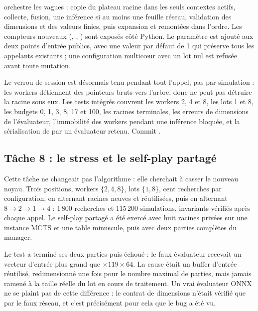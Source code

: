  orchestre les vagues : copie du plateau racine dans
les seuls contextes actifs, collecte, fusion, une inf\'erence si au moins une
feuille r\'eseau, validation des dimensions et des valeurs finies, puis
expansion et remont\'ees dans l'ordre. Les compteurs nouveaux
(, , ) sont
expos\'es c\^ot\'e Python. Le param\`etre  est ajout\'e
aux deux points d'entr\'ee publics, avec une valeur par d\'efaut de 1 qui
pr\'eserve tous les appelants existants ; une configuration
multic\oe{}ur avec un lot nul est refus\'ee avant toute mutation.

Le verrou de session est d\'esormais tenu pendant tout l'appel, pas par
simulation : les workers d\'etiennent des pointeurs bruts vers l'arbre, donc
 ne peut pas d\'etruire la racine sous eux. Les tests
int\'egr\'es couvrent les workers 2, 4 et 8, les lots 1 et 8, les budgets 0,
1, 3, 8, 17 et 100, les racines terminales, les erreurs de dimensions de
l'\'evaluateur, l'immobilit\'e des workers pendant une inf\'erence bloqu\'ee,
et la s\'erialisation de  par un \'evaluateur retenu.
Commit .

\subsection{T\^ache 8 : le stress et le self-play partag\'e}
\label{sec:t8}

Cette t\^ache ne changeait pas l'algorithme : elle cherchait \`a casser le
nouveau noyau. Trois positions, workers $\{2, 4, 8\}$, lots $\{1, 8\}$, cent
recherches par configuration, en alternant racines neuves et r\'eutilis\'ees,
puis en alternant $8 \to 2 \to 1 \to 4$ : 1\,800 recherches et 115\,200
simulations, invariants v\'erifi\'es apr\`es chaque appel. Le self-play
partag\'e a \'et\'e exerc\'e avec huit racines priv\'ees sur une instance
MCTS et une table minuscule, puis avec deux parties compl\`etes du manager.

\begin{piege}
Le test  a termin\'e ses deux parties puis
\'echou\'e : le faux \'evaluateur recevait un vecteur d'entr\'ee plus grand que
 $\times 119 \times 64$. La cause \'etait un buffer
d'entr\'ee r\'eutilis\'e, redimensionn\'e une fois pour le nombre maximal de
parties, mais jamais ramen\'e \`a la taille r\'eelle du lot en cours de
traitement. Un vrai \'evaluateur ONNX ne se plaint pas de cette diff\'erence :
le contrat de dimensions n'\'etait v\'erifi\'e que par le faux r\'eseau, et
c'est pr\'ecis\'ement pour cela que le bug a \'et\'e vu.
\end{piege}

